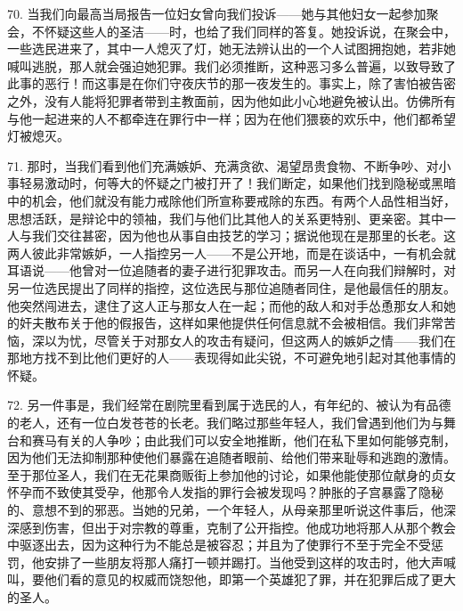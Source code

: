 70. 当我们向最高当局报告一位妇女曾向我们投诉——她与其他妇女一起参加聚会，不怀疑这些人的圣洁——时，也给了我们同样的答复。\newline{}她投诉说，在聚会中，一些选民进来了，其中一人熄灭了灯，她无法辨认出的一个人试图拥抱她，若非她喊叫逃脱，那人就会强迫她犯罪。\newline{}我们必须推断，这种恶习多么普遍，以致导致了此事的恶行！\newline{}而这事是在你们守夜庆节的那一夜发生的。\newline{}事实上，除了害怕被告密之外，没有人能将犯罪者带到主教面前，因为他如此小心地避免被认出。\newline{}仿佛所有与他一起进来的人不都牵连在罪行中一样；因为在他们猥亵的欢乐中，他们都希望灯被熄灭。\par

71. 那时，当我们看到他们充满嫉妒、充满贪欲、渴望昂贵食物、不断争吵、对小事轻易激动时，何等大的怀疑之门被打开了！我们断定，如果他们找到隐秘或黑暗中的机会，他们就没有能力戒除他们所宣称要戒除的东西。有两个人品性相当好，思想活跃，是辩论中的领袖，我们与他们比其他人的关系更特别、更亲密。其中一人与我们交往甚密，因为他也从事自由技艺的学习；据说他现在是那里的长老。这两人彼此非常嫉妒，一人指控另一人——不是公开地，而是在谈话中，一有机会就耳语说——他曾对一位追随者的妻子进行犯罪攻击。而另一人在向我们辩解时，对另一位选民提出了同样的指控，这位选民与那位追随者同住，是他最信任的朋友。他突然闯进去，逮住了这人正与那女人在一起；而他的敌人和对手怂恿那女人和她的奸夫散布关于他的假报告，这样如果他提供任何信息就不会被相信。我们非常苦恼，深以为忧，尽管关于对那女人的攻击有疑问，但这两人的嫉妒之情——我们在那地方找不到比他们更好的人——表现得如此尖锐，不可避免地引起对其他事情的怀疑。\par

72. 另一件事是，我们经常在剧院里看到属于选民的人，有年纪的、被认为有品德的老人，还有一位白发苍苍的长老。我们略过那些年轻人，我们曾遇到他们为与舞台和赛马有关的人争吵；由此我们可以安全地推断，他们在私下里如何能够克制，因为他们无法抑制那种使他们暴露在追随者眼前、给他们带来耻辱和逃跑的激情。至于那位圣人，我们在无花果商贩街上参加他的讨论，如果他能使那位献身的贞女怀孕而不致使其受孕，他那令人发指的罪行会被发现吗？肿胀的子宫暴露了隐秘的、意想不到的邪恶。当她的兄弟，一个年轻人，从母亲那里听说这件事后，他深深感到伤害，但出于对宗教的尊重，克制了公开指控。他成功地将那人从那个教会中驱逐出去，因为这种行为不能总是被容忍；并且为了使罪行不至于完全不受惩罚，他安排了一些朋友将那人痛打一顿并踢打。当他受到这样的攻击时，他大声喊叫，要他们看的意见的权威而饶恕他，即第一个英雄犯了罪，并在犯罪后成了更大的圣人。\par


